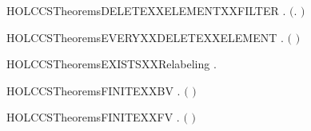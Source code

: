 \newcommand{\HOLCCSTheoremsDELETEXXELEMENTXXAPPEND}{\UseVerbatim{HOLCCSTheoremsDELETEXXELEMENTXXAPPEND}}
\begin{SaveVerbatim}{HOLCCSTheoremsDELETEXXELEMENTXXFILTER}
\HOLTokenTurnstile{} \HOLSymConst{\HOLTokenForall{}} .    \HOLSymConst{\ensuremath{=}}  \ensuremath{(}\HOLTokenLambda{}.  \HOLSymConst{\HOLTokenNotEqual{}} \ensuremath{)} 
\end{SaveVerbatim}
\newcommand{\HOLCCSTheoremsDELETEXXELEMENTXXFILTER}{\UseVerbatim{HOLCCSTheoremsDELETEXXELEMENTXXFILTER}}
\begin{SaveVerbatim}{HOLCCSTheoremsEVERYXXDELETEXXELEMENT}
\HOLTokenTurnstile{} \HOLSymConst{\HOLTokenForall{}}  .   \HOLSymConst{\HOLTokenConj{}}   \ensuremath{(}  \ensuremath{)} \HOLSymConst{\HOLTokenImp{}}   
\end{SaveVerbatim}
\newcommand{\HOLCCSTheoremsEVERYXXDELETEXXELEMENT}{\UseVerbatim{HOLCCSTheoremsEVERYXXDELETEXXELEMENT}}
\begin{SaveVerbatim}{HOLCCSTheoremsEXISTSXXRelabeling}
\HOLTokenTurnstile{} \HOLSymConst{\HOLTokenExists{}}.  
\end{SaveVerbatim}
\newcommand{\HOLCCSTheoremsEXISTSXXRelabeling}{\UseVerbatim{HOLCCSTheoremsEXISTSXXRelabeling}}
\begin{SaveVerbatim}{HOLCCSTheoremsFINITEXXBV}
\HOLTokenTurnstile{} \HOLSymConst{\HOLTokenForall{}}.  \ensuremath{(} \ensuremath{)}
\end{SaveVerbatim}
\newcommand{\HOLCCSTheoremsFINITEXXBV}{\UseVerbatim{HOLCCSTheoremsFINITEXXBV}}
\begin{SaveVerbatim}{HOLCCSTheoremsFINITEXXFV}
\HOLTokenTurnstile{} \HOLSymConst{\HOLTokenForall{}}.  \ensuremath{(} \ensuremath{)}
\end{SaveVerbatim}
\newcommand{\HOLCCSTheoremsFINITEXXFV}{\UseVerbatim{HOLCCSTheoremsFINITEXXFV}}

